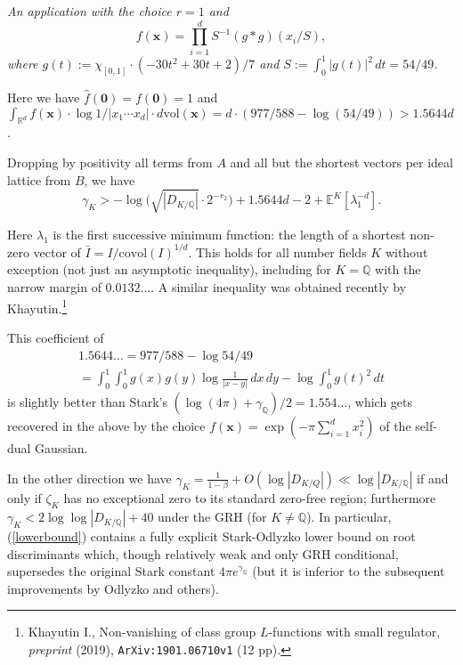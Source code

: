 \documentclass[12pt]{amsart}
\newcommand{\R}{\mathbb{R}}
\newcommand{\Q}{\mathbb{Q}}
\begin{document}
\medskip

{\it An application with the choice $r = 1$ and
$$
f(\mathbf{x}) = \prod_{i=1}^d S^{-1}(g * g)(x_i/S),
$$
 where $g(t) := \chi_{[0,1]} \cdot (-30t^2+30t+2)/7$ and $S := \int_0^1 |g(t)|^2 \, dt = 54/49$.}


\medskip

Here we have $\hat{f}(\mathbf{0}) = f(\mathbf{0}) = 1$ and  $\int_{\R^d} f(\mathbf{x}) \cdot \log 1/|x_1\cdots x_d| \cdot d\mathrm{vol}(\mathbf{x}) = d \cdot (977/588 - \log{ (54/49)}) > 1.5644 d$.

Dropping by positivity all terms from $A$ and all but the shortest vectors per ideal lattice from $B$, we have
\begin{equation} \label{lowerbound}
\gamma_K > - \log{\big( \sqrt{|D_{K/\Q}|} \cdot 2^{-r_2} \big)} + 1.5644d - 2 + \mathbb{E}^K[\lambda_1^{-d}].
\end{equation}

Here $\lambda_1$ is the first successive minimum function: the length of a shortest non-zero vector of $\bar{I} = I / \mathrm{covol}(I)^{1/d}$. This holds for all number fields $K$ without exception (not just an asymptotic inequality), including for $K = \Q$ with the narrow margin of $0.0132\ldots$.
A similar inequality was obtained recently by Khayutin.\footnote{Khayutin I., Non-vanishing of class group $L$-functions with small regulator, {\it preprint} (2019), \texttt{ArXiv:1901.06710v1} (12 pp).}

This coefficient of
\begin{eqnarray*}
1.5644\ldots = 977/588 - \log{ 54/49} \\ = \int_0^1 \int_0^1 g(x)g(y) \log{\frac{1}{|x-y|}} \, dx \, dy  - \log{\int_0^1} g(t)^2 \, dt
\end{eqnarray*}
 is slightly better than Stark's $(\log{(4\pi)} + \gamma_{\Q})/2 = 1.554\ldots$, which gets recovered in the above by the choice $f(\mathbf{x}) = \exp(-\pi \sum_{i=1}^d x_i^2)$ of the self-dual Gaussian.


In the other direction we have $\gamma_K = \frac{1}{1-\beta} + O(\log{|D_{K/Q}|}) \ll \log{|D_{K/\Q}|}$ if and only if $\zeta_K$ has no exceptional zero to its standard zero-free region; furthermore $\gamma_K < 2\log{\log{|D_{K/\Q}|}} + 40$ under the GRH (for $K \neq \Q$).  In particular, (\ref{lowerbound}) contains a fully explicit Stark-Odlyzko lower bound on root discriminants which, though relatively weak and only GRH conditional, supersedes the original Stark constant $4\pi e^{\gamma_{\Q}}$ (but it is inferior to the subsequent improvements by Odlyzko and others).
\end{document}
